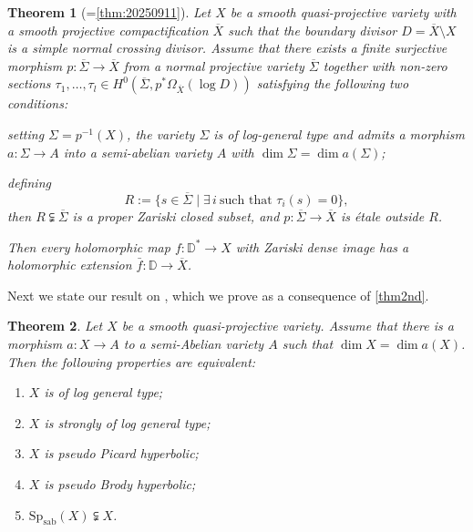\documentclass[11pt,english]{smfart}
\theoremstyle{plain}
\newtheorem{thmx}{Theorem}
\theoremstyle{definition}
\theoremstyle{remark}
\numberwithin{equation}{section}
\theoremstyle{plain}
\newcommand{\Spab}{\mathrm{Sp}_{\mathrm{sab}}}
\begin{document}
\begin{thmx}[=\cref{thm:20250911}]\label{thm:theorem b}
	Let $X$ be a smooth quasi-projective variety with a smooth projective compactification $\overline{X}$ such that the boundary divisor $D=\overline{X}\setminus X$ is a simple normal crossing divisor. 
	Assume that there exists a finite surjective morphism $p:\overline{\Sigma}\to \overline{X}$ from a normal projective variety $\overline{\Sigma}$ together with non-zero sections $\tau_1,\ldots,\tau_l \in H^0(\overline{\Sigma}, p^*\Omega_{\overline{X}}(\log D))$ satisfying the following two conditions:
	\begin{thmenum} 
		\item  
		setting $\Sigma=p^{-1}(X)$, the variety $\Sigma$ is of log-general type and admits a morphism $a:\Sigma\to A$ into a semi-abelian variety $A$ with $\dim \Sigma=\dim a(\Sigma)$;
		\item  
		defining
		\[ 
		R:=\{s\in \overline{\Sigma} \mid \exists\, i \ \text{such that } \tau_i(s)=0 \}, 
		\]
		then $R\subsetneqq \overline{\Sigma}$ is a proper Zariski closed subset, and $p:\overline{\Sigma}\to \overline{X}$ is \'etale outside $R$.
	\end{thmenum}
	Then every holomorphic map $f:\mathbb D^*\to X$ with Zariski dense image has a holomorphic extension $\bar{f}:\mathbb D\to\overline{X}$.
\end{thmx}

	
	
	Next we state our result on , which we prove as a consequence of \cref{thm2nd}.
	\begin{thmx}\label{cor:20221102}
		Let $X$ be a smooth quasi-projective variety. 
		Assume that there is a morphism $a:X\to A$ to a semi-Abelian variety $A$ such that $\dim X=\dim a(X)$.
		Then the following properties are equivalent:  
		\begin{enumerate}[wide = 0pt,  noitemsep,  font=\normalfont, label=(\alph*)] 
			\item \label{being general type1} $X$ is of log general type; 
			 	\item \label{strong LGT1} 
			$X$ is strongly of log general type;  
			\item  \label{pseudo Picard1} $X$ is pseudo Picard hyperbolic;
			\item \label{pseudo Brody} $X$ is pseudo Brody hyperbolic;
			\item \label{spab}
			$\Spab(X)\subsetneqq X$. 
		\end{enumerate}
	\end{thmx}  
	
\end{document}
